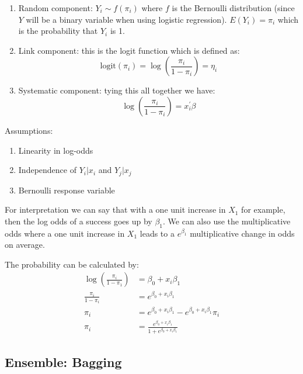 \documentclass[paper=a4, fontsize=11pt]{scrartcl} %
\numberwithin{equation}{section} %
\numberwithin{figure}{section} %
\numberwithin{table}{section} %
\begin{document}
\begin{enumerate}
\item Random component: $Y_i \sim f(\pi_i)$ where $f$ is the Bernoulli distribution (since $Y$ will be a binary variable when using logistic regression). $E(Y_i) = \pi_i $ which is the probability that $Y_i$ is 1.
\item Link component: this is the logit function which is defined as:
\begin{equation}
\text{logit}(\pi_i) = \log \left(\frac{\pi_i}{1-\pi_i} \right) = \eta_i
\end{equation}
\item Systematic component: tying this all together we have:
\begin{equation}
\log \left(\frac{\pi_i}{1-\pi_i}\right) = x_i^\prime \beta
\end{equation}
\end{enumerate}

Assumptions:
\begin{enumerate}
\item Linearity in log-odds
\item Independence of $Y_i|x_i$ and $Y_j|x_j$
\item Bernoulli response variable
\end{enumerate}

For interpretation we can say that with a one unit increase in $X_1$ for example, then the log odds of a success goes up by $\beta_1$. We can also use the multiplicative odds where a one unit increase in $X_1$ leads to a $e^{\beta_1}$ multiplicative change in odds on average.

The probability can be calculated by:
\begin{equation}
\begin{split}
\log \left(\frac{\pi_i}{1-\pi_1} \right) & = \beta_0 + x_i \beta_1 \\
\frac{\pi_i}{1-\pi_i} &= e^{\beta_0 + x_i \beta_1} \\
\pi_i &= e^{\beta_0 + x_i \beta_1} - e^{\beta_0 + x_i \beta_1} \pi_i \\
\pi_i &= \frac{e^{\beta_0 + x_i \beta_1}}{1+e^{\beta_0 + x_i \beta_1}}
\end{split}
\end{equation}

\subsection{Ensemble: Bagging}
\end{document}
